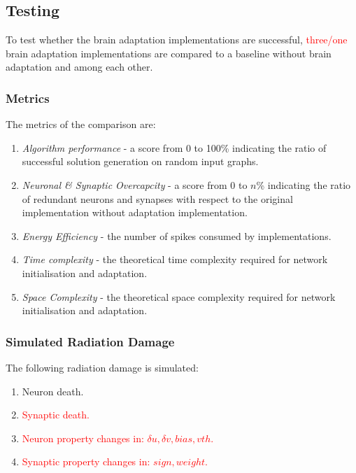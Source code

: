 \subsection{Testing}\label{subsec:testing}
To test whether the brain adaptation implementations are successful, \textcolor{red}{three/one} brain adaptation implementations are compared to a baseline without brain adaptation and among each other. 

\subsubsection{Metrics}\label{subsubsec:metrics}
The metrics of the comparison are:
\begin{enumerate}
    \item \textit{Algorithm performance} - a score from 0 to 100\% indicating the ratio of successful solution generation on random input graphs.
    \item \textit{Neuronal \& Synaptic Overcapcity} - a score from 0 to $n$\% indicating the ratio of redundant neurons and synapses with respect to the original implementation without adaptation implementation. %
    \item \textit{Energy Efficiency} - the number of spikes consumed by implementations.
    \item \textit{Time complexity} - the theoretical time complexity required for network initialisation and adaptation.
    \item \textit{Space Complexity} - the theoretical space complexity required for network initialisation and adaptation.
\end{enumerate}

\subsubsection{Simulated Radiation Damage}\label{subsubsec:simulated_radiation_damage}
The following radiation damage is simulated:
\begin{enumerate}
    \item Neuron death.
    \item \textcolor{red}{Synaptic death.}
    \item \textcolor{red}{Neuron property changes in: $\delta u,\delta v, bias,vth$.}
    \item \textcolor{red}{Synaptic property changes in: $sign,weight$.}
\end{enumerate}

